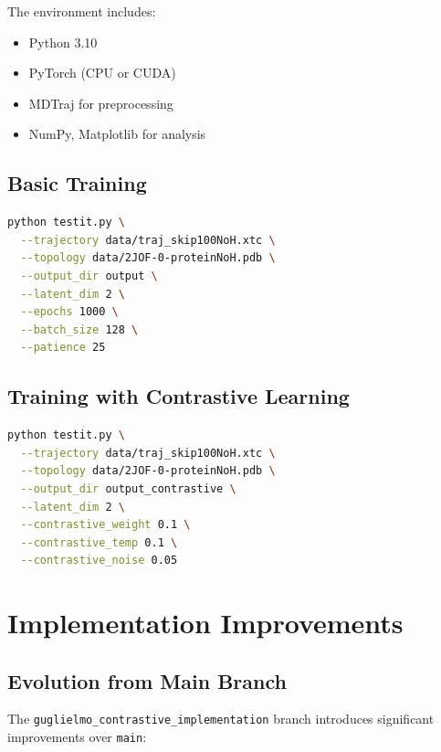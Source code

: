 \documentclass[12pt,a4paper]{article}
\begin{document}
The environment includes:
\begin{itemize}
    \item Python 3.10
    \item PyTorch (CPU or CUDA)
    \item MDTraj for preprocessing
    \item NumPy, Matplotlib for analysis
\end{itemize}

\subsection{Basic Training}

\begin{lstlisting}[language=bash]
python testit.py \
  --trajectory data/traj_skip100NoH.xtc \
  --topology data/2JOF-0-proteinNoH.pdb \
  --output_dir output \
  --latent_dim 2 \
  --epochs 1000 \
  --batch_size 128 \
  --patience 25
\end{lstlisting}

\subsection{Training with Contrastive Learning}

\begin{lstlisting}[language=bash]
python testit.py \
  --trajectory data/traj_skip100NoH.xtc \
  --topology data/2JOF-0-proteinNoH.pdb \
  --output_dir output_contrastive \
  --latent_dim 2 \
  --contrastive_weight 0.1 \
  --contrastive_temp 0.1 \
  --contrastive_noise 0.05
\end{lstlisting}


\section{Implementation Improvements}

\subsection{Evolution from Main Branch}

The \texttt{guglielmo\_contrastive\_implementation} branch introduces significant improvements over \texttt{main}:
\end{document}
